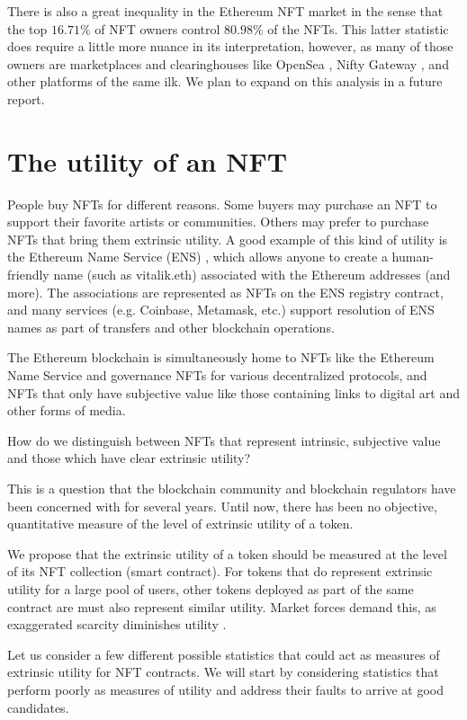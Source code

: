 \documentclass{article}
\begin{document}
There is also a great inequality in the Ethereum NFT market in the sense that the top $16.71\%$ of NFT owners control $80.98\%$ of the NFTs. This latter statistic does require a little more nuance in its interpretation, however, as many of those owners are marketplaces and clearinghouses like OpenSea \cite{opensea}, Nifty Gateway \cite{nifty}, and other platforms of the same ilk. We plan to expand on this analysis in a future report.

\section{The utility of an NFT}

People buy NFTs for different reasons. Some buyers may purchase an NFT to support their favorite artists or communities. Others may prefer to purchase NFTs that bring them extrinsic utility. A good example of this kind of utility is the Ethereum Name Service (ENS) \cite{ens}, which allows anyone to create a human-friendly name (such as vitalik.eth) associated with the Ethereum addresses (and more). The associations are represented as NFTs on the ENS registry contract, and many services (e.g. Coinbase, Metamask, etc.) support resolution of ENS names as part of transfers and other blockchain operations.

The Ethereum blockchain is simultaneously home to NFTs like the Ethereum Name Service and governance NFTs for various decentralized protocols, and NFTs that only have subjective value like those containing links to digital art and other forms of media.

How do we distinguish between NFTs that represent intrinsic, subjective value  and those which have clear extrinsic utility?

This is a question that the blockchain community and blockchain regulators have been concerned with for several years. Until now, there has been no objective, quantitative measure of the level of extrinsic utility of a token.

We propose that the extrinsic utility of a token should be measured at the level of its NFT collection (smart contract). For tokens that do represent extrinsic utility for a large pool of users, other tokens deployed as part of the same contract are must also represent similar utility. Market forces demand this, as exaggerated scarcity diminishes utility \cite{menger}.

Let us consider a few different possible statistics that could act as measures of extrinsic utility for NFT contracts. We will start by considering statistics that perform poorly as measures of utility and address their faults to arrive at good candidates.
\end{document}
